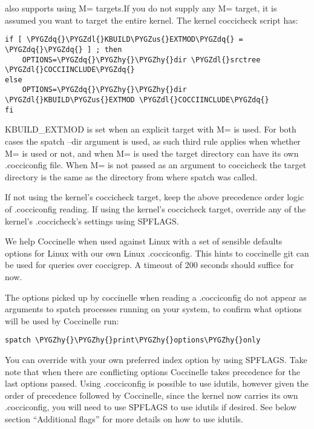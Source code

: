 \documentclass[a4paper,8pt,english]{sphinxmanual}
\def\PYGZus{\char`\_}
\def\PYGZdl{\char`\$}
\def\PYGZhy{\char`\-}
\def\PYGZdq{\char`\"}
\begin{document}
 also supports using M= targets.If you do not supply
any M= target, it is assumed you want to target the entire kernel.
The kernel coccicheck script has:

\begin{Verbatim}[commandchars=\\\{\}]
if [ \PYGZdq{}\PYGZdl{}KBUILD\PYGZus{}EXTMOD\PYGZdq{} = \PYGZdq{}\PYGZdq{} ] ; then
    OPTIONS=\PYGZdq{}\PYGZhy{}\PYGZhy{}dir \PYGZdl{}srctree \PYGZdl{}COCCIINCLUDE\PYGZdq{}
else
    OPTIONS=\PYGZdq{}\PYGZhy{}\PYGZhy{}dir \PYGZdl{}KBUILD\PYGZus{}EXTMOD \PYGZdl{}COCCIINCLUDE\PYGZdq{}
fi
\end{Verbatim}

KBUILD\_EXTMOD is set when an explicit target with M= is used. For both cases
the spatch --dir argument is used, as such third rule applies when whether M=
is used or not, and when M= is used the target directory can have its own
.cocciconfig file. When M= is not passed as an argument to coccicheck the
target directory is the same as the directory from where spatch was called.

If not using the kernel's coccicheck target, keep the above precedence
order logic of .cocciconfig reading. If using the kernel's coccicheck target,
override any of the kernel's .coccicheck's settings using SPFLAGS.

We help Coccinelle when used against Linux with a set of sensible defaults
options for Linux with our own Linux .cocciconfig. This hints to coccinelle
git can be used for  queries over coccigrep. A timeout of 200
seconds should suffice for now.

The options picked up by coccinelle when reading a .cocciconfig do not appear
as arguments to spatch processes running on your system, to confirm what
options will be used by Coccinelle run:

\begin{Verbatim}[commandchars=\\\{\}]
spatch \PYGZhy{}\PYGZhy{}print\PYGZhy{}options\PYGZhy{}only
\end{Verbatim}

You can override with your own preferred index option by using SPFLAGS. Take
note that when there are conflicting options Coccinelle takes precedence for
the last options passed. Using .cocciconfig is possible to use idutils, however
given the order of precedence followed by Coccinelle, since the kernel now
carries its own .cocciconfig, you will need to use SPFLAGS to use idutils if
desired. See below section ``Additional flags'' for more details on how to use
idutils.
\end{document}
